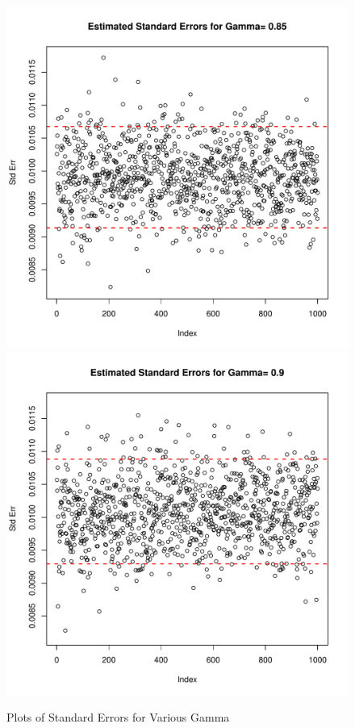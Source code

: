 \documentclass[a4paper, 11pt]{report}
\begin{document}
\begin{enumerate}
\begin{figure}[H]
				\includegraphics[scale=0.50]{index_plot_se_s5_r50_g85.pdf}			
				\includegraphics[scale=0.50]{index_plot_se_s5_r50_g90.pdf} 			
				\caption{Plots of Standard Errors for Various Gamma}
				\label{gammaplot2}
			\end{figure}
	    	

\end{enumerate}
\end{document}
